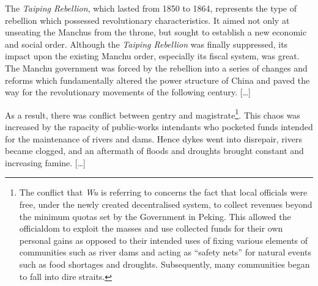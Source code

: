 \begin{mdframed}[style=fancyquote]
        The \textit{Taiping Rebellion}, which lasted from 1850 to 1864,
        represents the type of rebellion which possessed revolutionary
        characteristics. It aimed not only at unseating the Manchus from the
        throne, but sought to establish a new economic and social order.
        Although the \textit{Taiping Rebellion} was finally suppressed, its
        impact upon the existing Manchu order, especially its fiscal system, was
        great. The Manchu government was forced by the rebellion into a series
        of changes and reforms which fundamentally altered the power structure
        of China and paved the way for the revolutionary movements of the
        following century. [\ldots]

        As a result, there was conflict between gentry and
        magistrate\footnote{The conflict that \textit{Wu} is referring to
        concerns the fact that local officials were free, under the
        newly created decentralised system, to collect revenues beyond the
        minimum quotas set by the Government in Peking. This allowed the
        officialdom to exploit the masses and use collected funds for their own
        personal gains as opposed to their intended uses of fixing various
        elements of communities such as river dams and acting as ``safety nets''
        for natural events such as food shortages and droughts. Subsequently,
        many communities began to fall into dire straits.}. This chaos was
        increased by the rapacity of public-works intendants who pocketed funds
        intended for the maintenance of rivers and dams. Hence dykes went into
        disrepair, rivers became clogged, and an aftermath of floods and
        droughts brought constant and increasing famine. [\ldots]
	\begin{flushright}
		\autocite{Wu:1950}
	\end{flushright}
\end{mdframed}

